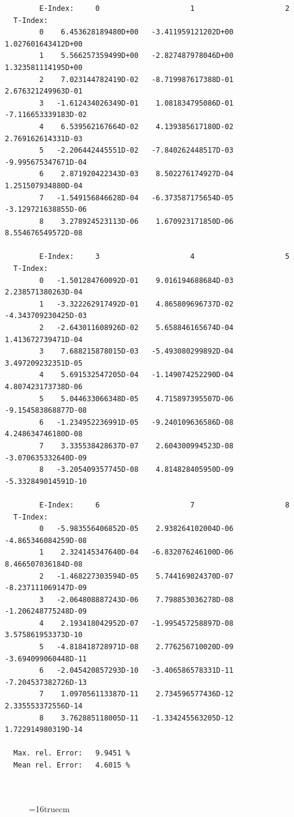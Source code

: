 \documentclass[12pt,dvips]{article}
\begin{document}
\begin{small}\begin{verbatim}
        E-Index:     0                     1                     2
  T-Index:
        0    6.453628189480D+00   -3.411959121202D+00    1.027601643412D+00
        1    5.566257359499D+00   -2.827487978046D+00    1.323581114195D+00
        2    7.023144782419D-02   -8.719987617388D-01    2.676321249963D-01
        3   -1.612434026349D-01    1.081834795086D-01   -7.116653339183D-02
        4    6.539562167664D-02    4.139385617180D-02    2.769162614331D-03
        5   -2.206442445551D-02   -7.840262448517D-03   -9.995675347671D-04
        6    2.871920422343D-03    8.502276174927D-04    1.251507934880D-04
        7   -1.549156846628D-04   -6.373587175654D-05   -3.129721638855D-06
        8    3.278924523113D-06    1.670923171850D-06    8.554676549572D-08

        E-Index:     3                     4                     5
  T-Index:
        0   -1.501284760092D-01    9.016194688684D-03    2.238571380263D-04
        1   -3.322262917492D-01    4.865809696737D-02   -4.343709230425D-03
        2   -2.643011608926D-02    5.658846165674D-04    1.413672739471D-04
        3    7.688215878015D-03   -5.493080299892D-04    3.497209232351D-05
        4    5.691532547205D-04   -1.149074252290D-04    4.807423173738D-06
        5    5.044633066348D-05    4.715897395507D-06   -9.154583868877D-08
        6   -1.234952236991D-05   -9.240109636586D-08    4.248634746180D-08
        7    3.335538428637D-07    2.604300994523D-08   -3.070635332640D-09
        8   -3.205409357745D-08    4.814828405950D-09   -5.332849014591D-10

        E-Index:     6                     7                     8
  T-Index:
        0   -5.983556406852D-05    2.938264102004D-06   -4.865346084259D-08
        1    2.324145347640D-04   -6.832076246100D-06    8.466507036184D-08
        2   -1.468227303594D-05    5.744169024370D-07   -8.237111069147D-09
        3   -2.064808887243D-06    7.798853036278D-08   -1.206248775248D-09
        4    2.193418042952D-07   -1.995457258897D-08    3.575861953373D-10
        5   -4.818418728971D-08    2.776256710020D-09   -3.694099060448D-11
        6   -2.045420857293D-10   -3.406586578331D-11   -7.204537382726D-13
        7    1.097056113387D-11    2.734596577436D-12    2.335553372556D-14
        8    3.762885118005D-11   -1.334245563205D-12    1.722914980319D-14

  Max. rel. Error:   9.9451 %
  Mean rel. Error:   4.6015 %



\end{verbatim}\end{small}
\begin{figure} \label{2.3.6lr1}
\epsfxsize=16truecm
\end{figure}
\newpage
\end{document}
